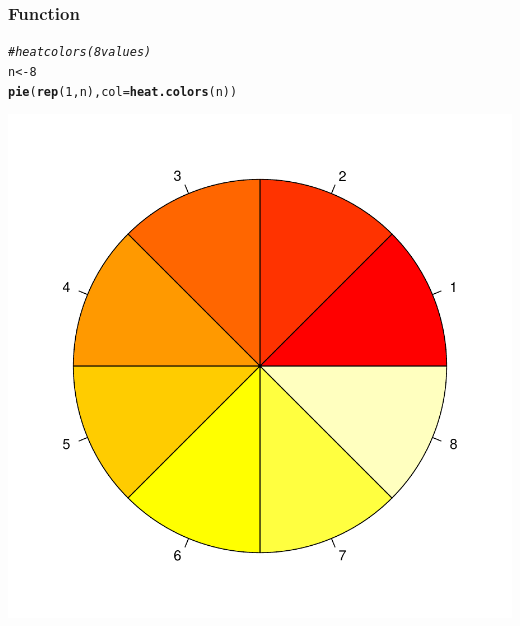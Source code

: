 \documentclass[12pt]{beamer}\usepackage[]{graphicx}\usepackage[]{color}
\makeatletter
\newcommand{\hlnum}[1]{\textcolor[rgb]{0.686,0.059,0.569}{#1}}%
\newcommand{\hlcom}[1]{\textcolor[rgb]{0.678,0.584,0.686}{\textit{#1}}}%
\newcommand{\hlstd}[1]{\textcolor[rgb]{0.345,0.345,0.345}{#1}}%
\newcommand{\hlkwb}[1]{\textcolor[rgb]{0.69,0.353,0.396}{#1}}%
\newcommand{\hlkwc}[1]{\textcolor[rgb]{0.333,0.667,0.333}{#1}}%
\newcommand{\hlkwd}[1]{\textcolor[rgb]{0.737,0.353,0.396}{\textbf{#1}}}%
\newenvironment{kframe}{%
 \def\at@end@of@kframe{}%
 \ifinner\ifhmode%
  \def\at@end@of@kframe{\end{minipage}}%
  \begin{minipage}{\columnwidth}%
 \fi\fi%
 \def\FrameCommand##1{\hskip\@totalleftmargin \hskip-\fboxsep
 \colorbox{shadecolor}{##1}\hskip-\fboxsep
     \hskip-\linewidth \hskip-\@totalleftmargin \hskip\columnwidth}%
 \MakeFramed {\advance\hsize-\width
   \@totalleftmargin\z@ \linewidth\hsize
   \@setminipage}}%
 {\par\unskip\endMakeFramed%
 \at@end@of@kframe}
\newenvironment{knitrout}{}{} %
\makeatother
\begin{document}
\begin{frame}[fragile]
\frametitle{Function }

\begin{knitrout}\scriptsize
{}\color{fgcolor}\begin{kframe}
\begin{alltt}
\hlcom{# heat colors (8 values)}
\hlstd{n} \hlkwb{<-} \hlnum{8}
\hlkwd{pie}\hlstd{(}\hlkwd{rep}\hlstd{(}\hlnum{1}\hlstd{, n),} \hlkwc{col} \hlstd{=} \hlkwd{heat.colors}\hlstd{(n))}
\end{alltt}
\end{kframe}

{\centering \includegraphics[width=.4\linewidth,height=.4\linewidth]{figure/heatcolors-1} 

}



\end{knitrout}

\end{frame}

\end{document}
